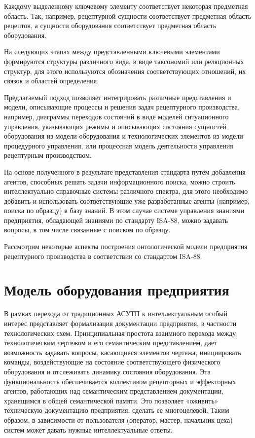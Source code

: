 Каждому выделенному ключевому элементу соответствует некоторая предметная область. Так, например, рецептурной сущности соответствует предметная область рецептов, а сущности оборудования соответствует предметная область оборудования.

На следующих этапах между представленными ключевыми элементами формируются структуры различного вида, в виде таксономий или реляционных структур, для этого используются обозначения соответствующих отношений, их связок и областей определения.

Предлагаемый подход позволяет интегрировать различные представления и модели, описывающие процессы и решения задач рецептурного производства, например, диаграммы переходов состояний в виде моделей ситуационного управления, указывающих режимы и описывающих состояния сущностей оборудования из модели оборудования и технологических элементов из модели процедурного управления, или процессная модель деятельности управления рецептурным производством.

На основе полученного в результате представления стандарта путём добавления агентов, способных решать задачи информационного поиска, можно строить интеллектуально справочные системы различного спектра, для этого необходимо добавить и использовать соответствующие уже разработанные агенты (например, поиска по образцу) в базу знаний. В этом случае системе управления знаниями предприятия, обладающей знаниями по стандарту ISA-88, можно задавать вопросы, в том числе связанные с поиском по образцу.

Рассмотрим некоторые аспекты построения онтологической модели предприятия рецептурного производства в соответствии со стандартом ISA-88.

\section{Модель оборудования предприятия}

В рамках перехода от традиционных АСУТП к интеллектуальным особый интерес представляет формализация документации предприятия, в частности технологических схем. Принципиальная простота взаимного перехода между технологическим чертежом и его семантическим представлением, дает возможность задавать вопросы, касающиеся элементов чертежа, инициировать команды, воздействующие на состояние соответствующего физического оборудования и отслеживать динамику состояния оборудования. Эта функциональность обеспечивается коллективом рецепторных и эффекторных агентов, работающих над семантическим представлением документации, хранящимся в общей семантической памяти. Это позволяет «оживить» техническую документацию предприятия, сделать ее многоцелевой. Таким образом, в зависимости от пользователя (оператор, мастер, начальник цеха) систем может давать нужные интеллектуальные ответы.

